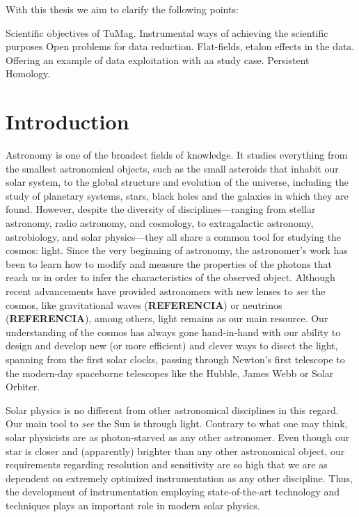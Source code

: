 With this thesis we aim to clarify the following points:

\begin{itemize}
  \Myitem Scientific objectives of TuMag.
  \Myitem Instrumental ways of achieving the scientific purposes
  \Myitem Open problems for data reduction. Flat-fields, etalon effects in the data. 
  \Myitem Offering an example of data exploitation with aa study case. Persistent Homology.
\end{itemize}

\section{Introduction}

Astronomy is one of the broadest fields of knowledge. It studies everything from the smallest astronomical objects, such as the small asteroids that inhabit our solar system, to the global structure and evolution of the universe, including the study of planetary systems, stars, black holes and the galaxies in which they are found. However, despite the diversity of disciplines—ranging from stellar astronomy, radio astronomy, and cosmology, to extragalactic astronomy, astrobiology, and solar physics—they all share a common tool for studying the cosmos: light. Since the very beginning of astronomy, the astronomer's work has been to learn how to modify and measure the properties of the photons that reach us in order to infer the characteristics of the observed object. Although recent advancements have provided astronomers with new lenses to \textit{see} the cosmos, like gravitational waves (\textbf{REFERENCIA}) or neutrinos (\textbf{REFERENCIA}), among others, light remains as our main resource. Our understanding of the cosmos has always gone hand-in-hand with our ability to design and develop new (or more efficient) and clever ways to disect the light, spanning from the first solar clocks, passing through Newton's first telescope to the modern-day spaceborne telescopes like the Hubble, James Webb or Solar Orbiter. 

Solar physics is no different from other astronomical disciplines in this regard. Our main tool to \textit{see} the Sun is through light. Contrary to what one may think, solar physicists are as photon-starved as any other astronomer. Even though our star is closer and (apparently) brighter than any other astronomical object, our requirements regarding resolution and sensitivity are so high that we are as dependent on extremely optimized instrumentation as any other discipline. Thus, the development of instrumentation employing state-of-the-art technology and techniques plays an important role in modern solar physics.


